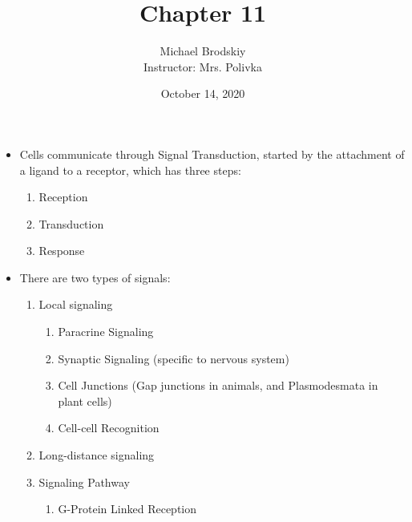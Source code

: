 \documentclass[12pt]{article}
\title{Chapter 11}
\date{October 14, 2020}
\author{Michael Brodskiy\\ \small Instructor: Mrs. Polivka}
\begin{document}
\maketitle

\begin{itemize}

  \item Cells communicate through Signal Transduction, started by the attachment of a ligand to a receptor,  which has three steps:

    \begin{enumerate}

      \item Reception

      \item Transduction

      \item Response

    \end{enumerate}

  \item There are two types of signals:

    \begin{enumerate}

      \item Local signaling

        \begin{enumerate}

          \item Paracrine Signaling

          \item Synaptic Signaling (specific to nervous system)

          \item Cell Junctions (Gap junctions in animals, and Plasmodesmata in plant cells)

          \item Cell-cell Recognition

        \end{enumerate}

      \item Long-distance signaling

      \item Signaling Pathway

        \begin{enumerate}

          \item G-Protein Linked Reception

            \begin{enumerate}


\end{enumerate}
\end{enumerate}
\end{enumerate}
\end{itemize}
\end{document}
